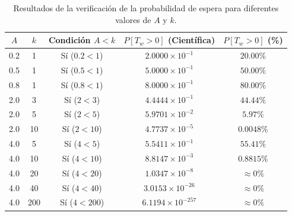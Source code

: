 \documentclass[11pt, a4paper]{article}
\begin{document}
\clearpage
\begin{table}[t]
\centering
\caption{Resultados de la verificación de la probabilidad de espera para diferentes valores de $A$ y $k$.}
\label{tab:resultados_verificacion}
\vspace{0.3em}
\begin{tabular}{ccccc}
\toprule
\textbf{$A$} & \textbf{$k$} & \textbf{Condición $A < k$} & \textbf{$P[T_w > 0]$ (Científica)} & \textbf{$P[T_w > 0]$ (\%)} \\
\midrule
0.2 & 1   & Sí ($0.2 < 1$)   & $2.0000 \times 10^{-1}$   & $20.00\%$ \\
0.5 & 1   & Sí ($0.5 < 1$)   & $5.0000 \times 10^{-1}$   & $50.00\%$ \\
0.8 & 1   & Sí ($0.8 < 1$)   & $8.0000 \times 10^{-1}$   & $80.00\%$ \\
\midrule
2.0 & 3   & Sí ($2 < 3$)    & $4.4444 \times 10^{-1}$   & $44.44\%$ \\
2.0 & 5   & Sí ($2 < 5$)    & $5.9701 \times 10^{-2}$   & $5.97\%$ \\
2.0 & 10  & Sí ($2 < 10$)   & $4.7737 \times 10^{-5}$   & $0.0048\%$ \\
\midrule
4.0 & 5   & Sí ($4 < 5$)    & $5.5411 \times 10^{-1}$   & $55.41\%$ \\
4.0 & 10  & Sí ($4 < 10$)   & $8.8147 \times 10^{-3}$   & $0.8815\%$ \\
4.0 & 20  & Sí ($4 < 20$)   & $1.0347 \times 10^{-8}$   & $\approx 0\%$ \\
4.0 & 40  & Sí ($4 < 40$)   & $3.0153 \times 10^{-26}$  & $\approx 0\%$ \\
4.0 & 200 & Sí ($4 < 200$)  & $6.1194 \times 10^{-257}$ & $\approx 0\%$ \\
\bottomrule
\end{tabular}
\end{table}
\end{document}
